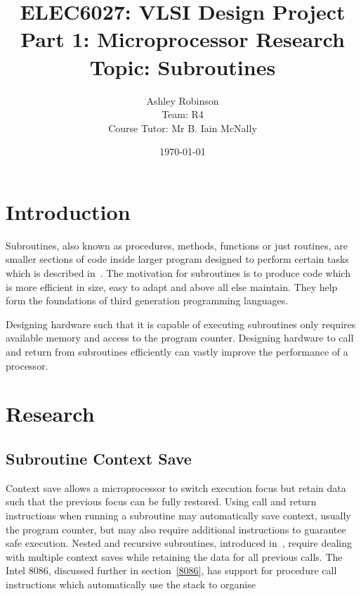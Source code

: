 \documentclass[12pt,a4paper]{article}
\title{ELEC6027: VLSI Design Project \\Part 1: Microprocessor Research\\Topic: Subroutines}
\author{Ashley Robinson\\ Team: R4\\Course Tutor: Mr B. Iain McNally}
\date{\today}
\begin{document}
\begin{titlepage}
\maketitle
\end{titlepage}

\tableofcontents
\clearpage

\lstset{
   frame=L,
   basicstyle=\footnotesize,        %
   captionpos=b
}


\section{Introduction}

Subroutines, also known as procedures, methods, functions or just routines, are smaller sections of code inside larger program designed to perform certain tasks which is described in~\cite{alison}.
The motivation for subroutines is to produce code which is more efficient in size, easy to adapt and above all else maintain. 
They help form the foundations of third generation programming languages.

Designing hardware such that it is capable of executing subroutines only requires available memory and access to the program counter.
Designing hardware to call and return from subroutines efficiently can vastly improve the performance of a processor. 


\section{Research}

\subsection{Subroutine Context Save }
Context save allows a microprocessor to switch execution focus but retain data such that the previous focus can be fully restored.
Using call and return instructions when running a subroutine may automatically save context, usually the program counter, but may also require additional instructions to guarantee safe execution.
Nested and recursive subroutines, introduced in~\cite{IainPrograms}, require dealing with multiple context saves while retaining the data for all previous calls. 
The Intel 8086, discussed further in section~\ref{8086}, has support for procedure call instructions which automatically use the stack to organise  
\end{document}

